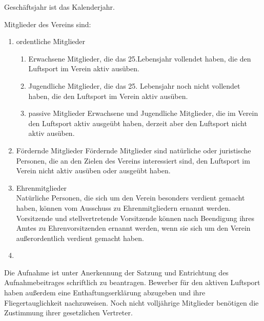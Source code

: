 \documentclass[10pt,a4paper,parskip=half]{scrartcl}
\providecommand{\DIFaddtex}[1]{{\protect\color{blue}\uwave{#1}}} %
\providecommand{\DIFaddbegin}{} %
\providecommand{\DIFaddend}{} %
\providecommand{\DIFadd}[1]{\texorpdfstring{\DIFaddtex{#1}}{#1}} %
\newcommand{\DIFaddincludegraphics}[2][]{{\color{blue}\fbox{\DIFOincludegraphics[#1]{#2}}}} %
\DeclareRobustCommand{\DIFaddbegin}{\DIFOaddbegin \let\includegraphics\DIFaddincludegraphics} %
\DeclareRobustCommand{\DIFaddend}{\DIFOaddend \let\includegraphics\DIFOincludegraphics} %
\begin{document}
\begin{contract}
    Geschäftsjahr ist das Kalenderjahr.

    \label{C:Mitglieder}

    Mitglieder des Vereins sind:
    \begin{enumerate}
      \item ordentliche Mitglieder
            \begin{enumerate}
              \item Erwachsene Mitglieder,
                    die das 25.Lebensjahr vollendet haben,
                    die den Luftsport im Verein aktiv
                    ausüben. \label{S:OrdentlicheMitglieder:Erwachsene}
              \item Jugendliche Mitglieder,
                    die das 25. Lebensjahr noch nicht vollendet haben,
                    die den Luftsport im Verein aktiv ausüben. \label{S:OrdentlicheMitglieder:Jugendliche}
              \item{passive Mitglieder} Erwachsene und Jugendliche Mitglieder,
                    die im Verein den Luftsport aktiv ausgeübt haben,
                    derzeit aber den Luftsport nicht aktiv ausüben.
            \end{enumerate}
      \item{Fördernde Mitglieder} Fördernde Mitglieder sind natürliche oder juristische Personen,
            die an den Zielen des Vereins interessiert sind,
            den Luftsport im Verein nicht aktiv ausüben oder ausgeübt haben.

      \item{Ehrenmitglieder}\\
            Natürliche Personen,
            die sich um den Verein besonders verdient gemacht haben,
            können vom Ausschuss zu Ehrenmitgliedern ernannt werden.
            Vorsitzende und stellvertretende Vorsitzende können nach Beendigung ihres Amtes zu Ehrenvorsitzenden ernannt werden,
            wenn sie sich um den Verein außerordentlich verdient gemacht haben.
      \DIFaddbegin \item \DIFadd{Mitglieder auf Probe}\label{S:MitgliederAufProbe}
    \DIFaddend \end{enumerate}\label{S:OrdentlicheMitglieder}


    Die Aufnahme ist unter Anerkennung der Satzung und Entrichtung des Aufnahmebeitrages schriftlich zu beantragen.
    Bewerber für den aktiven Luftsport haben außerdem eine Enthaftungserklärung abzugeben und ihre Fliegertauglichkeit nachzuweisen.
    Noch nicht volljährige Mitglieder benötigen die Zustimmung ihrer gesetzlichen Vertreter.


\end{contract}
\end{document}
